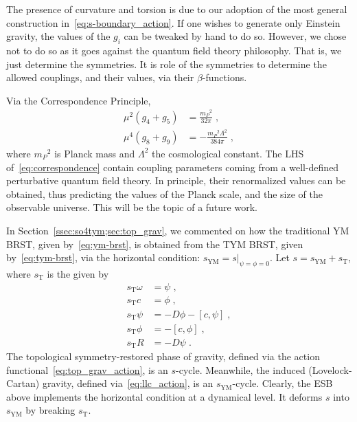 \documentclass[../main.tex]{subfiles}
\begin{document}
The presence of curvature and torsion is due to our adoption of the most general construction in~\eqref{eq:s-boundary_action}. If one wishes to generate only Einstein gravity, the values of the $ g_i $ can be tweaked by hand to do so. However, we chose not to do so as it goes against the quantum field theory philosophy. That is, we just determine the symmetries. It is role of the symmetries to determine the allowed couplings, and their values, via their $ \beta $-functions.

Via the Correspondence Principle,
\begin{subequations}%
  \label{eq:correspondence}
  \begin{align}
    \mu^2 \left( g_4+g_5 \right) & = \frac{{m_P}^2}{32\pi} \;,            \\
    \mu^4 \left( g_8+g_9 \right) & = -\frac{{m_P}^2\Lambda^2}{384\pi} \;,
  \end{align}
\end{subequations}
where ${m_P}^2$ is Planck mass and $\Lambda^2$ the cosmological constant. The LHS of~\eqref{eq:correspondence} contain coupling parameters coming from a well-defined perturbative quantum field theory. In principle, their renormalized values can be obtained, thus predicting the values of the Planck scale, and the size of the observable universe. This will be the topic of a future work.

In Section~\ref{ssec:so4tym;sec:top_grav}, we commented on how the traditional YM BRST, given by~\eqref{eq:ym-brst}, is obtained from the TYM BRST, given by~\eqref{eq:tym-brst}, via the horizontal condition: $ s_{\text{YM}} = s|_{\psi = \phi = 0} $. Let $ s = s_{\text{YM}} + s_{\text{T}} $, where $ s_{\text{T}} $ is the  given by
\begin{subequations}%
  \label{eq:s_T}
  \begin{align}
    s_{\text{T}} \omega & = \psi \;,                              \\
    s_{\text{T}} c      & = \phi \;,                              \\
    s_{\text{T}} \psi   & = - D \phi - \left[ c, \psi \right] \;, \\
    s_{\text{T}} \phi   & = - \left[ c, \phi \right] \;,          \\
    s_{\text{T}} R      & = - D \psi \;.
  \end{align}
\end{subequations}
The topological symmetry-restored phase of gravity, defined via the action functional~\eqref{eq:top_grav_action}, is an $s$-cycle. Meanwhile, the induced (Lovelock-Cartan) gravity, defined via~\eqref{eq:llc_action}, is an $ s_{\text{YM}} $-cycle. Clearly, the ESB above implements the horizontal condition at a dynamical level. It deforms $ s $ into $ s_{\text{YM}} $ by breaking $ s_{\text{T}} $.
\end{document}
